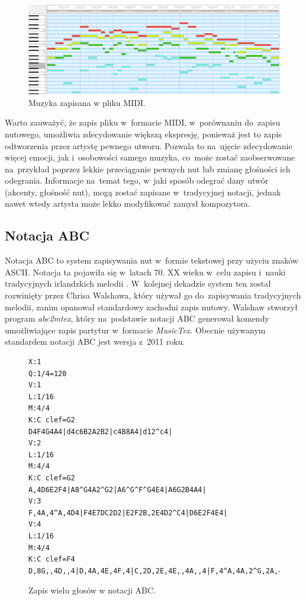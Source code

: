 \documentclass[data-science]{agh-wi} %
\begin{document}
\begin{figure}[ht!]
    \begin{center}
        \includegraphics*[width=\linewidth]{./img/piano_roll.png}
    \end{center}
    \caption{Muzyka zapisana w pliku MIDI.}\label{fig:jsb_pianoroll}
\end{figure}

Warto zauważyć, że zapis pliku w~formacie MIDI, w~porównaniu do~zapisu nutowego, umożliwia zdecydowanie większą ekspresję, ponieważ jest to zapis odtworzenia przez artystę pewnego utworu. Pozwala to na~ujęcie zdecydowanie więcej emocji, jak i~osobowości samego muzyka, co~może zostać zaobserwowane na~przykład poprzez lekkie przeciąganie pewnych nut lub zmianę głośności ich odegrania. Informacje na~temat tego, w~jaki sposób odegrać dany utwór (akcenty, głośność nut), mogą zostać zapisane w~tradycyjnej notacji, jednak nawet wtedy artysta może lekko modyfikować zamysł kompozytora.

\subsection{Notacja ABC}
Notacja ABC to system zapisywania nut w~formie tekstowej przy użyciu znaków ASCII. Notacja ta pojawiła się w~latach 70. XX wieku w~celu zapisu i~nauki tradycyjnych irlandzkich melodii \cite{abc_history}. W~kolejnej dekadzie system ten został rozwinięty przez Chrisa Walshawa, który używał go do~zapisywania tradycyjnych melodii, zanim opanował standardowy zachodni zapis nutowy. Walshaw stworzył program \textit{abc2mtex}, który na~podstawie notacji ABC generował komendy umożliwiające zapis partytur w~formacie \textit{MusicTex}. Obecnie używanym standardem notacji ABC jest wersja z~2011 roku.

\begin{figure}[ht!]
    \begin{verbatim}
X:1
Q:1/4=120
V:1
L:1/16
M:4/4
K:C clef=G2
D4F4G4A4|d4c6B2A2B2|c4B8A4|d12^c4|
V:2
L:1/16
M:4/4
K:C clef=G2
A,4D6E2F4|A8^G4A2^G2|A6^G^F^G4E4|A6G2B4A4|
V:3
F,4A,4^A,4D4|F4E7DC2D2|E2F2B,2E4D2^C4|D6E2F4E4|
V:4
L:1/16
M:4/4
K:C clef=F4
D,8G,,4D,,4|D,4A,4E,4F,4|C,2D,2E,4E,,4A,,4|F,4^A,4A,2^G,2A,4|        
\end{verbatim}
    \caption{Zapis wielu głosów w notacji ABC.}\label{fig:abc_polyphony}
\end{figure}
\end{document}
